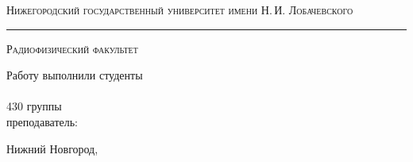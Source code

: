 	\begin{titlepage}
		\begin{center}
			
			
			\textsc{Нижегородский государственный университет имени Н.\,И. Лобачевского}
			\vskip 4pt \hrule \vskip 8pt
			\textsc{Радиофизический факультет}
			
			\vfill
			
			{\Huge\labtheme}
			
		\end{center}
		
		\vfill
		
		\begin{flushright}
			{Работу выполнили студенты\\ \labauthors\\ 430 группы\\ \vskip 14pt преподаватель:\\ \sciadviser}
		\end{flushright}
		
		\vfill
		
		\begin{center}
			Нижний Новгород, \the\year
		\end{center}
	\end{titlepage}
	\tableofcontents
	\newpage 
